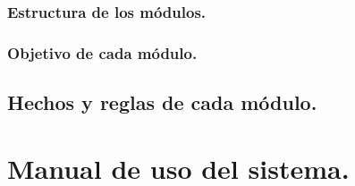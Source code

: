 \documentclass[12pt, spanish]{article}
\begin{document}
\subsubsection{Estructura de los módulos.}

\subsubsection{Objetivo de cada módulo.}


\subsection{Hechos y reglas de cada módulo.}


\section{Manual de uso del sistema.}
\end{document}
